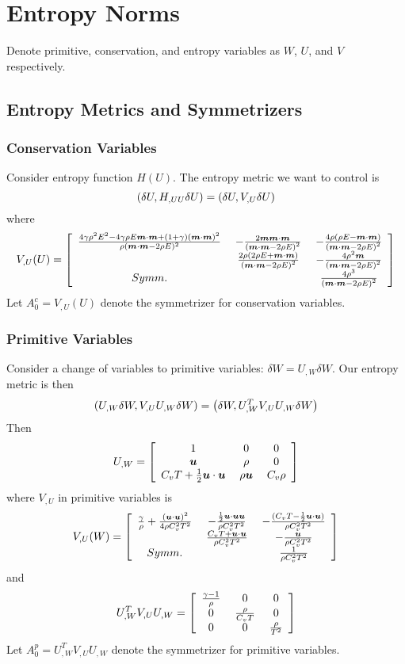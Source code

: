 \documentclass{article}
\begin{document}
\section*{Entropy Norms}
Denote primitive, conservation, and entropy variables as $W$, $U$, and $V$ respectively.

\subsection*{Entropy Metrics and Symmetrizers}
\subsubsection*{Conservation Variables}
Consider entropy function $H(U)$.
The entropy metric we want to control is 
\[
\left( \delta U,H_{,UU}\delta U \right)=\left( \delta U,V_{,U}\delta U \right)
\]
where
\[
V_{,U}(U)=\left[ \begin{array}{ccc} \frac{4\gamma\rho^2E^2-4\gamma\rho E\boldsymbol m\cdot\boldsymbol m+(1+\gamma)(\boldsymbol m\cdot\boldsymbol m)^2}{\rho(\boldsymbol m\cdot\boldsymbol m-2\rho E)^2}\; & -\frac{2\boldsymbol m\boldsymbol m\cdot\boldsymbol m}{\left( \boldsymbol m\cdot\boldsymbol m-2\rho E \right)^2}\; & -\frac{4\rho(\rho E-\boldsymbol m\cdot\boldsymbol m)}{\left( \boldsymbol m\cdot\boldsymbol m-2\rho E \right)^2}\\ \; & \frac{2\rho(2\rho E+\boldsymbol m\cdot\boldsymbol m)}{\left( \boldsymbol m\cdot\boldsymbol m-2\rho E \right)^2}\; & -\frac{4\rho^2\boldsymbol m}{\left( \boldsymbol m\cdot\boldsymbol m-2\rho E \right)^2}\\ Symm.\; & \; & \frac{4\rho^3}{\left( \boldsymbol m\cdot\boldsymbol m-2\rho E \right)^2}\\ \end{array} \right]
\]
Let $A_0^c=V_{,U}(U)$ denote the symmetrizer for conservation variables.

\subsubsection*{Primitive Variables}
Consider a change of variables to primitive variables: $\delta W=U_{,W}\delta W$.
Our entropy metric is then
\[
\left( U_{,W}\delta W,V_{,U}U_{,W}\delta W \right)=\left( \delta W,U_{,W}^TV_{,U}U_{,W}\delta W \right)
\]
Then
\[
U_{,W}=\left[ \begin{array}{ccc} 1\; & 0\; & 0\\ \boldsymbol u\; & \rho\; & 0\\ C_vT+\frac{1}{2}\boldsymbol u\cdot\boldsymbol u\; & \rho\boldsymbol u\; & C_v\rho\\ \end{array} \right]
\]
where $V_{,U}$ in primitive variables is
\[
V_{,U}(W)=\left[ \begin{array}{ccc} \frac{\gamma}{\rho}+\frac{(\boldsymbol u\cdot\boldsymbol u)^2}{4\rho C_v^2 T^2}\; & -\frac{\frac{1}{2}\boldsymbol u\cdot\boldsymbol u\boldsymbol u}{\rho C_v^2 T^2}\; & -\frac{(C_v T-\frac{1}{2}\boldsymbol u\cdot\boldsymbol u)}{\rho C_v^2 T^2}\\ \; & \frac{C_v T+\boldsymbol u\cdot\boldsymbol u}{\rho C_v^2 T^2}\; & -\frac{\boldsymbol u}{\rho C_v^2 T^2}\\ Symm.\; & \; & \frac{1}{\rho C_v^2 T^2}\\ \end{array} \right]
\]
and
\[
U_{,W}^TV_{,U}U_{,W}=\left[ \begin{array}{ccc} \frac{\gamma-1}{\rho}\; & 0\; & 0\\ 0\; & \frac{\rho}{C_v T}\; & 0\\ 0\; & 0\; & \frac{\rho}{T^2}\\ \end{array} \right]
\]
Let $A_0^p=U_{,W}^TV_{,U}U_{,W}$ denote the symmetrizer for primitive variables.
\end{document}
